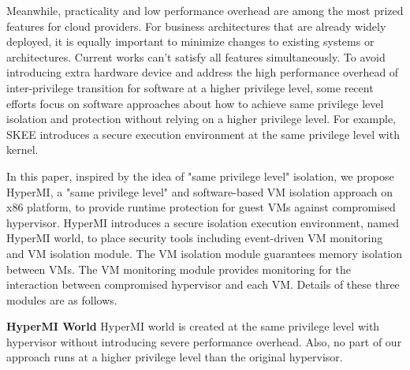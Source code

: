\documentclass[conference]{IEEEtran}
\begin{document}
Meanwhile, practicality and low performance overhead are among the most prized features for cloud providers. For business architectures that are already widely deployed, it is equally important to minimize changes to existing systems or architectures. Current works can't satisfy all features simultaneously. To avoid introducing extra hardware device and address the high performance overhead of inter-privilege transition for software at a higher privilege level, some recent efforts focus on software approaches about how to achieve same privilege level isolation and protection without relying on a higher privilege level. For example, SKEE\cite{Azab2016SKEE} introduces a secure execution environment at the same privilege level with kernel. 


In this paper, inspired by the idea of "same privilege level" isolation, we propose HyperMI, a "same privilege level" and software-based VM isolation approach on x86 platform, to provide runtime protection for guest VMs against compromised hypervisor. HyperMI introduces a secure isolation execution environment, named HyperMI world, to place security tools including event-driven VM monitoring and VM isolation module. The VM isolation module guarantees memory isolation between VMs. The VM monitoring module provides monitoring for the interaction between compromised hypervisor and each VM. 
Details of these three modules are as follows.

\textbf{HyperMI World}
HyperMI world is created at the same privilege level with hypervisor without introducing severe performance overhead. Also, no part of our approach runs at a higher privilege level than the original hypervisor.
\end{document}
